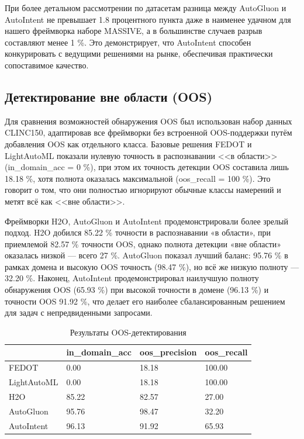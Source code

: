 \documentclass[14pt,a4paper,oneside,openany]{extbook}
\begin{document}
При более детальном рассмотрении по датасетам разница между AutoGluon и AutoIntent не превышает 1.8 процентного пункта даже в наименее удачном для нашего фреймворка наборе MASSIVE, а в большинстве случаев разрыв составляют менее 1 \%. Это демонстрирует, что AutoIntent способен конкурировать с ведущими решениями на рынке, обеспечивая практически сопоставимое качество.
\subsection{Детектирование вне области (OOS)}
\label{sec:org4404b69}

Для сравнения возможностей обнаружения OOS был использован набор данных CLINC150, адаптировав все фреймворки без встроенной OOS-поддержки путём добавления OOS как отдельного класса. Базовые решения FEDOT и LightAutoML показали нулевую точность в распознавании {}<<в области>>{} (in\_domain\_acc = 0 \%), при этом их точность детекции OOS составила лишь 18.18 \%, хотя полнота оказалась максимальной (oos\_recall = 100 \%). Это говорит о том, что они полностью игнорируют обычные классы намерений и метят всё как {}<<вне области>>{}.

Фреймворки H2O, AutoGluon и AutoIntent продемонстрировали более зрелый подход. H2O добился 85.22 \% точности в распознавании «в области», при приемлемой 82.57 \% точности OOS, однако полнота детекции «вне области» оказалась низкой — всего 27 \%. AutoGluon показал лучший баланс: 95.76 \% в рамках домена и высокую OOS точность (98.47 \%), но всё же низкую полноту — 32.20 \%. Наконец, AutoIntent продемонстрировал наилучшую полноту обнаружения OOS (65.93 \%) при высокой точности в домене (96.13 \%) и точности OOS 91.92 \%, что делает его наиболее сбалансированным решением для задач с непредвиденными запросами.

\begin{table}[h!]
\caption{\label{tbl:oos_detection}Результаты OOS-детектирования}
\centering
\begin{tabular}{|p{3cm}|p{2cm}|p{2cm}|p{2cm}|}
\hline
 & in\_domain\_acc & oos\_precision & oos\_recall\\
\hline
FEDOT & 0.00 & 18.18 & 100.00\\
\hline
LightAutoML & 0.00 & 18.18 & 100.00\\
\hline
H2O & 85.22 & 82.57 & 27.00\\
\hline
AutoGluon & 95.76 & 98.47 & 32.20\\
\hline
AutoIntent & 96.13 & 91.92 & 65.93\\
\hline
\end{tabular}
\end{table}
\end{document}
